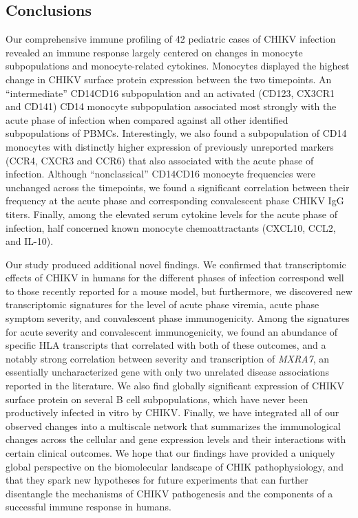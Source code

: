 \subsection{Conclusions}

Our comprehensive immune profiling of 42 pediatric cases of CHIKV infection revealed an immune response largely centered on changes in monocyte subpopulations and monocyte-related cytokines. Monocytes displayed the highest change in CHIKV surface protein expression between the two timepoints. An “intermediate” CD14\sups{++}\allowbreak CD16\sups{+} subpopulation and an activated (CD123\sups{+}, CX3CR1\sups{+} and CD141\sups{+}) CD14\sups{+} monocyte subpopulation associated most strongly with the acute phase of infection when compared against all other identified subpopulations of PBMCs. Interestingly, we also found a subpopulation of CD14\sups{+} monocytes with distinctly higher expression of previously unreported markers (CCR4, CXCR3 and CCR6) that also associated with the acute phase of infection. Although “nonclassical” CD14\sups{+}\allowbreak CD16\sups{++} monocyte frequencies were unchanged across the timepoints, we found a significant correlation between their frequency at the acute phase and corresponding convalescent phase CHIKV IgG titers. Finally, among the elevated serum cytokine levels for the acute phase of infection, half concerned known monocyte chemoattractants (CXCL10, CCL2, and IL-10).

Our study produced additional novel findings. We confirmed that transcriptomic effects of CHIKV in humans for the different phases of infection correspond well to those recently reported for a mouse model,\autocite{Wilson2017} but furthermore, we discovered new transcriptomic signatures for the level of acute phase viremia, acute phase symptom severity, and convalescent phase immunogenicity. Among the signatures for acute severity and convalescent immunogenicity, we found an abundance of specific HLA transcripts that correlated with both of these outcomes, and a notably strong correlation between severity and transcription of \emph{MXRA7}, an essentially uncharacterized gene with only two unrelated disease associations reported in the literature.\autocite{Sim2013,Veiga-Castelli2010} We also find globally significant expression of CHIKV surface protein on several B cell subpopulations, which have never been productively infected in vitro by CHIKV.\autocite{Her2010,Sourisseau2007,Teng2012a} Finally, we have integrated all of our observed changes into a multiscale network that summarizes the immunological changes across the cellular and gene expression levels and their interactions with certain clinical outcomes. We hope that our findings have provided a uniquely global perspective on the biomolecular landscape of CHIK pathophysiology, and that they spark new hypotheses for future experiments that can further disentangle the mechanisms of CHIKV pathogenesis and the components of a successful immune response in humans.

